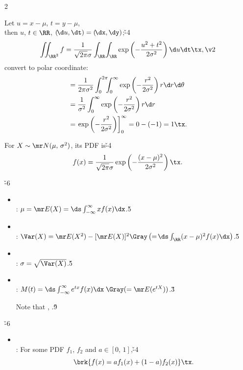 \documentclass[dvipdfmx,a4paper,titlepage,9pt]{jsarticle}
\begin{document}
\begin{multicols*}{2}
\begin{itemize}[label={-}]
\begin{Pfbox}[$f$: PDF?]
Let $u=x-\mu$, $t=y-\mu$,\\
then $u$, $t\in\RR$, $(\!\d u,\dt)=(\!\dx,\dy)$;\v{-4}
$$\iint_{\RR^2}f=\frac1{\sqrt{2\pi}\sigma}\int_\RR\!\int_\RR\exp\left(-\frac{u^2+t^2}{2\sigma^2}\right)\d u\dt\tx,\v2$$
convert to polar coordinate:
$$\begin{aligned}
&=\frac1{2\pi\sigma^2}\int_0^{2\pi}\!\!\!\int_0^\infty\exp\left(-\frac{r^2}{2\sigma^2}\right)r\d r\d\theta\\
&=\frac1{\sigma^2}\int_0^\infty\exp\left(-\frac{r^2}{2\sigma^2}\right)r\d r\\
&=\left.\exp\left(-\frac{r^2}{2\sigma^2}\right)\right]^\infty_0=0-(-1)=1\tx.
\end{aligned}$$
\end{Pfbox}

\;\; For $X\sim\mr N(\mu,\,\sigma^2)$, its PDF is\v{-4}
$$f(x)=\frac1{\sqrt{2\pi}\sigma}\exp\left(-\frac{(x-\mu)^2}{2\sigma^2}\right)\tx.$$
\end{itemize}

\vfill\null\columnbreak

\v{-6}
\begin{itemize}[label={-}]
\item{}\\
: $\mu=\mr E(X)=\ds\int_{-\infty}^\infty xf(x)\dx$.\v5

\item{}\\
: $\Var(X)=\mr E(X^2)-[\mr E(X)]^2{\Gray\left(=\!\ds\int_\RR (x-\mu)^2f(x)\dx\right)}$.\v5

\item{}\\
: $\sigma=\sqrt{\Var(X)}$.\v5

\item{}\\
: $M(t)=\ds\int_{-\infty}^\infty e^{tx}f(x)\dx\;{\Gray(=\mr E(e^{tX}))}$.\v3

\;\;Note that , .\v9
\end{itemize}

\v{-6}
\begin{itemize}[label={-}]
\item{}\\
: For some PDF $f_1$, $f_2$ and $a\in[0,\,1]$,\v{-4}
$$\brk{f(x)=af_1(x)+(1-a)f_2(x)}\tx.$$


\end{itemize}
\end{multicols*}
\end{document}
